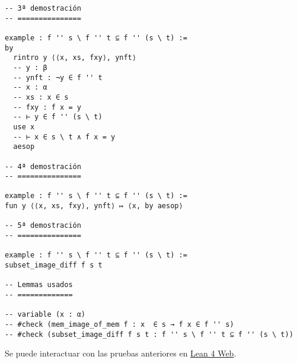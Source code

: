 \begin{verbatim}
-- 3ª demostración
-- ===============

example : f '' s \ f '' t ⊆ f '' (s \ t) :=
by
  rintro y ⟨⟨x, xs, fxy⟩, ynft⟩
  -- y : β
  -- ynft : ¬y ∈ f '' t
  -- x : α
  -- xs : x ∈ s
  -- fxy : f x = y
  -- ⊢ y ∈ f '' (s \ t)
  use x
  -- ⊢ x ∈ s \ t ∧ f x = y
  aesop

-- 4ª demostración
-- ===============

example : f '' s \ f '' t ⊆ f '' (s \ t) :=
fun y ⟨⟨x, xs, fxy⟩, ynft⟩ ↦ ⟨x, by aesop⟩

-- 5ª demostración
-- ===============

example : f '' s \ f '' t ⊆ f '' (s \ t) :=
subset_image_diff f s t

-- Lemmas usados
-- =============

-- variable (x : α)
-- #check (mem_image_of_mem f : x  ∈ s → f x ∈ f '' s)
-- #check (subset_image_diff f s t : f '' s \ f '' t ⊆ f '' (s \ t))
\end{verbatim}
Se puede interactuar con las pruebas anteriores en \href{https://lean.math.hhu.de/\#url=https://raw.githubusercontent.com/jaalonso/Calculemus2/main/src/Imagen\_de\_la\_diferencia\_de\_conjuntos.lean}{Lean 4 Web}.

